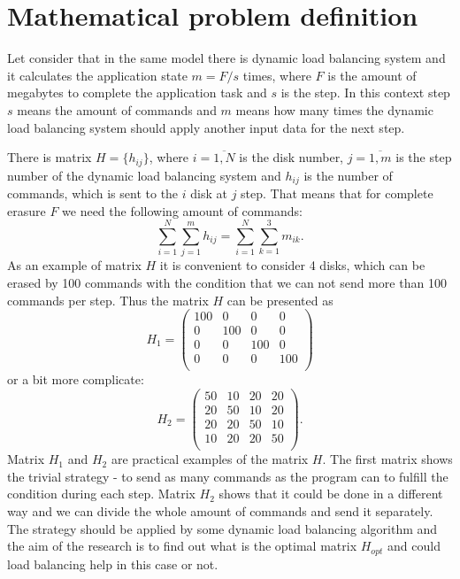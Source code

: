 \section{Mathematical problem definition}
Let consider that in the same model there is dynamic load balancing system and it calculates the application state $m=F/s$ times, where $F$ is the amount of megabytes to complete the application task and $s$ is the step. In this context step $s$ means the amount of commands and $m$ means how many times the dynamic load balancing system should apply another input data for the next step.

There is matrix $H=\{h_{ij}\}$, where $i=\overline{1,N}$ is the disk number, $j=\overline{1,m}$ is the step number of the dynamic load balancing system and $h_{ij}$ is the number of commands, which is sent to the $i$ disk at $j$ step. That means that for complete erasure $F$ we need the following amount of commands:
\begin{equation}
\label{eq:load_balancing_matrix}
	\sum_{i=1}^{N}\sum_{j=1}^{m}h_{ij} = \sum_{i=1}^{N}\sum_{k=1}^{3}m_{ik}.
\end{equation}
As an example of matrix $H$ it is convenient to consider 4 disks, which can be erased by 100 commands with the condition that we can not send more than 100 commands per step. Thus the matrix $H$ can be presented as 
\begin{equation}
	H_1 =
	\begin{pmatrix}
		100 & 0 & 0 & 0 \\
		0 & 100 & 0 & 0 \\
		0 & 0 & 100 & 0 \\
		0 & 0 & 0 & 100 \\
	\end{pmatrix}
\end{equation}
or a bit more complicate:
\begin{equation}
	H_2 =
	\begin{pmatrix}
		50 & 10 & 20 & 20 \\
		20 & 50 & 10 & 20 \\
		20 & 20 & 50 & 10 \\
		10 & 20 & 20 & 50 \\
	\end{pmatrix}.
\end{equation}
Matrix $H_1$ and $H_2$ are practical examples of the matrix $H$. The first matrix shows the trivial strategy - to send as many commands as the program can to fulfill the condition during each step. Matrix $H_2$ shows that it could be done in a different way and we can divide the whole amount of commands and send it separately. The strategy should be applied by some dynamic load balancing algorithm and the aim of the research is to find out what is the optimal matrix $H_{opt}$ and could load balancing help in this case or not.

